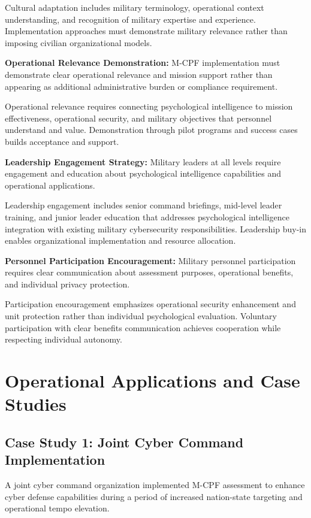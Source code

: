 \documentclass[10pt, twocolumn]{article}
\begin{document}
Cultural adaptation includes military terminology, operational context understanding, and recognition of military expertise and experience. Implementation approaches must demonstrate military relevance rather than imposing civilian organizational models.

\textbf{Operational Relevance Demonstration:} M-CPF implementation must demonstrate clear operational relevance and mission support rather than appearing as additional administrative burden or compliance requirement.

Operational relevance requires connecting psychological intelligence to mission effectiveness, operational security, and military objectives that personnel understand and value. Demonstration through pilot programs and success cases builds acceptance and support.

\textbf{Leadership Engagement Strategy:} Military leaders at all levels require engagement and education about psychological intelligence capabilities and operational applications.

Leadership engagement includes senior command briefings, mid-level leader training, and junior leader education that addresses psychological intelligence integration with existing military cybersecurity responsibilities. Leadership buy-in enables organizational implementation and resource allocation.

\textbf{Personnel Participation Encouragement:} Military personnel participation requires clear communication about assessment purposes, operational benefits, and individual privacy protection.

Participation encouragement emphasizes operational security enhancement and unit protection rather than individual psychological evaluation. Voluntary participation with clear benefits communication achieves cooperation while respecting individual autonomy.

\section{Operational Applications and Case Studies}

\subsection{Case Study 1: Joint Cyber Command Implementation}

A joint cyber command organization implemented M-CPF assessment to enhance cyber defense capabilities during a period of increased nation-state targeting and operational tempo elevation.
\end{document}
